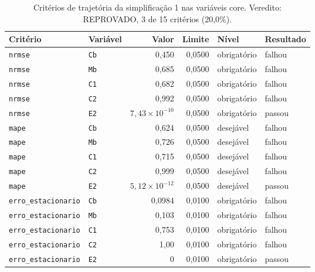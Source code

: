\begin{table}[htbp]
\centering
\caption{Critérios de trajetória da simplificação 1 nas variáveis core. Veredito: REPROVADO, 3 de 15 critérios (20,0\%).}
\label{tab:simp1-criterios}
\begin{tabular}{llrrll}
\toprule
Critério & Variável & Valor & Limite & Nível & Resultado \\
\midrule
\texttt{nrmse} & \texttt{Cb} & 0{,}450 & 0{,}0500 & obrigatório & falhou \\
\texttt{nrmse} & \texttt{Mb} & 0{,}685 & 0{,}0500 & obrigatório & falhou \\
\texttt{nrmse} & \texttt{C1} & 0{,}682 & 0{,}0500 & obrigatório & falhou \\
\texttt{nrmse} & \texttt{C2} & 0{,}992 & 0{,}0500 & obrigatório & falhou \\
\texttt{nrmse} & \texttt{E2} & $7{,}43 \times 10^{-10}$ & 0{,}0500 & obrigatório & passou \\
\texttt{mape} & \texttt{Cb} & 0{,}624 & 0{,}0500 & desejável & falhou \\
\texttt{mape} & \texttt{Mb} & 0{,}726 & 0{,}0500 & desejável & falhou \\
\texttt{mape} & \texttt{C1} & 0{,}715 & 0{,}0500 & desejável & falhou \\
\texttt{mape} & \texttt{C2} & 0{,}999 & 0{,}0500 & desejável & falhou \\
\texttt{mape} & \texttt{E2} & $5{,}12 \times 10^{-12}$ & 0{,}0500 & desejável & passou \\
\texttt{erro\_estacionario} & \texttt{Cb} & 0{,}0984 & 0{,}0100 & obrigatório & falhou \\
\texttt{erro\_estacionario} & \texttt{Mb} & 0{,}103 & 0{,}0100 & obrigatório & falhou \\
\texttt{erro\_estacionario} & \texttt{C1} & 0{,}753 & 0{,}0100 & obrigatório & falhou \\
\texttt{erro\_estacionario} & \texttt{C2} & 1{,}00 & 0{,}0100 & obrigatório & falhou \\
\texttt{erro\_estacionario} & \texttt{E2} & 0 & 0{,}0100 & obrigatório & passou \\
\bottomrule
\end{tabular}
\end{table}
